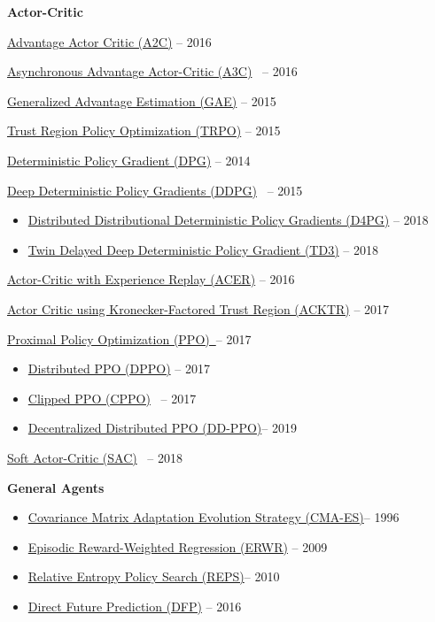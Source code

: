 \documentclass[
  a4paper,
  DIV=11,
  numbers=noendperiod]{scrreprt}
\providecommand{\tightlist}{%
  \setlength{\itemsep}{0pt}\setlength{\parskip}{0pt}}\usepackage{longtable,booktabs,array}
\begin{document}
\textbf{Actor-Critic}

\href{https://arxiv.org/abs/1602.01783}{Advantage Actor Critic (A2C)} --
2016

\href{https://arxiv.org/abs/1602.01783}{Asynchronous Advantage
Actor-Critic (A3C)}~ -- 2016

\href{https://arxiv.org/abs/1506.02438}{Generalized Advantage Estimation
(GAE)} -- 2015

\href{https://arxiv.org/abs/1502.05477}{Trust Region Policy Optimization
(TRPO)} -- 2015

\href{http://proceedings.mlr.press/v32/silver14.pdf}{Deterministic
Policy Gradient (DPG)} -- 2014

\href{https://arxiv.org/abs/1509.02971}{Deep Deterministic Policy
Gradients (DDPG)}~ -- 2015

\begin{itemize}
\tightlist
\item
  \href{https://arxiv.org/abs/1804.08617}{Distributed Distributional
  Deterministic Policy Gradients (D4PG)} -- 2018
\item
  \href{https://arxiv.org/pdf/1802.09477.pdf}{Twin Delayed Deep
  Deterministic Policy Gradient (TD3)} -- 2018
\end{itemize}

\href{https://arxiv.org/abs/1611.01224}{Actor-Critic with Experience
Replay (ACER)} -- 2016

\href{https://arxiv.org/abs/1708.05144}{Actor Critic using
Kronecker-Factored Trust Region (ACKTR)} -- 2017

\href{https://arxiv.org/abs/1707.06347}{Proximal Policy Optimization
(PPO)~}-- 2017

\begin{itemize}
\tightlist
\item
  \href{https://arxiv.org/abs/1707.02286}{Distributed PPO (DPPO)} --
  2017
\item
  \href{https://arxiv.org/pdf/1707.06347.pdf}{Clipped PPO (CPPO)}~ --
  2017
\item
  \href{https://arxiv.org/abs/1911.00357}{Decentralized Distributed PPO
  (DD-PPO)}-- 2019
\end{itemize}

\href{https://arxiv.org/abs/1801.01290}{Soft Actor-Critic (SAC)}~ --
2018

\textbf{General Agents}

\begin{itemize}
\tightlist
\item
  \href{https://ieeexplore.ieee.org/document/542381}{Covariance Matrix
  Adaptation Evolution Strategy (CMA-ES)}-- 1996
\item
  \href{https://papers.nips.cc/paper/3545-policy-search-for-motor-primitives-in-robotics.pdf}{Episodic
  Reward-Weighted Regression (ERWR)} -- 2009
\item
  \href{https://www.aaai.org/ocs/index.php/AAAI/AAAI10/paper/viewFile/1851/2264}{Relative
  Entropy Policy Search (REPS)}-- 2010
\item
  \href{https://arxiv.org/abs/1611.01779}{Direct Future Prediction
  (DFP)} -- 2016
\end{itemize}
\end{document}
